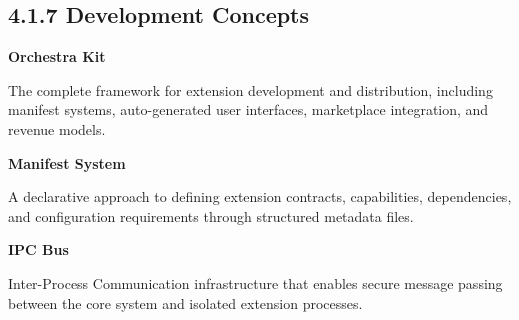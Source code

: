 \subsection*{4.1.7 Development Concepts}

\vspace{0.3cm}

\noindent\textbf{Orchestra Kit}

The complete framework for extension development and distribution, including manifest systems, auto-generated user interfaces, marketplace integration, and revenue models.

\vspace{0.3cm}

\noindent\textbf{Manifest System}

A declarative approach to defining extension contracts, capabilities, dependencies, and configuration requirements through structured metadata files.

\vspace{0.3cm}

\noindent\textbf{IPC Bus}

Inter-Process Communication infrastructure that enables secure message passing between the core system and isolated extension processes.
